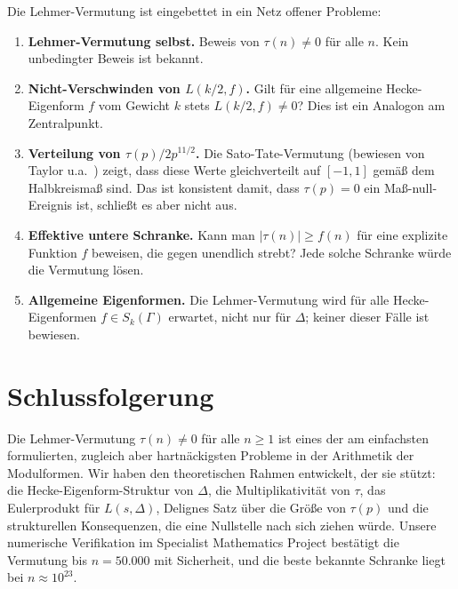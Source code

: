 \documentclass[12pt,a4paper]{amsart}
\theoremstyle{definition}
\begin{document}
Die Lehmer-Vermutung ist eingebettet in ein Netz offener Probleme:

\begin{enumerate}[leftmargin=2em, label=\textbullet]
  \item \textbf{Lehmer-Vermutung selbst.} Beweis von $\tau(n) \neq 0$ für alle $n$.
        Kein unbedingter Beweis ist bekannt.
  \item \textbf{Nicht-Verschwinden von $L(k/2, f)$.} Gilt für eine allgemeine
        Hecke-Eigenform $f$ vom Gewicht $k$ stets $L(k/2, f) \neq 0$? Dies ist
        ein Analogon am Zentralpunkt.
  \item \textbf{Verteilung von $\tau(p)/2p^{11/2}$.} Die Sato-Tate-Vermutung
        (bewiesen von Taylor u.a.\ \cite{Taylor2008}) zeigt, dass diese Werte
        gleichverteilt auf $[-1, 1]$ gemäß dem Halbkreismaß sind. Das ist
        konsistent damit, dass $\tau(p) = 0$ ein Maß-null-Ereignis ist,
        schließt es aber nicht aus.
  \item \textbf{Effektive untere Schranke.} Kann man $|\tau(n)| \geq f(n)$ für
        eine explizite Funktion $f$ beweisen, die gegen unendlich strebt? Jede
        solche Schranke würde die Vermutung lösen.
  \item \textbf{Allgemeine Eigenformen.} Die Lehmer-Vermutung wird für alle
        Hecke-Eigenformen $f \in S_k(\Gamma)$ erwartet, nicht nur für $\Delta$;
        keiner dieser Fälle ist bewiesen.
\end{enumerate}

\section{Schlussfolgerung}

Die Lehmer-Vermutung $\tau(n) \neq 0$ für alle $n \geq 1$ ist eines der am
einfachsten formulierten, zugleich aber hartnäckigsten Probleme in der Arithmetik
der Modulformen. Wir haben den theoretischen Rahmen entwickelt, der sie stützt: die
Hecke-Eigenform-Struktur von $\Delta$, die Multiplikativität von $\tau$, das
Eulerprodukt für $L(s, \Delta)$, Delignes Satz über die Größe von $\tau(p)$ und die
strukturellen Konsequenzen, die eine Nullstelle nach sich ziehen würde. Unsere
numerische Verifikation im Specialist Mathematics Project bestätigt die Vermutung
bis $n = 50{.}000$ mit Sicherheit, und die beste bekannte Schranke liegt bei
$n \approx 10^{23}$.
\end{document}

